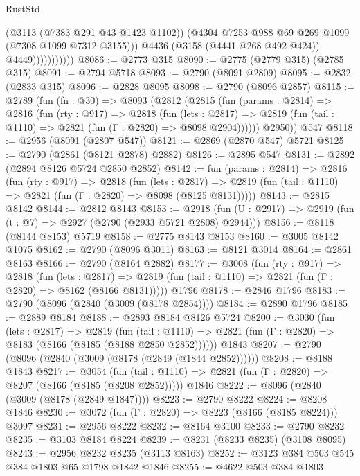 \begin{lexlean}{RustStd}
\begin{coremodule}
{\begin{coremodule}
{{{{{{{{{{{{{{{{{{{{{{{{{{                            (@3113 (@7383 @291 @43 @1423 @1102))
                            (@4304 @7253 @988 @69 @269 @1099 (@7308 @1099 @7312 @3155)))
                          @4436
                          (@3158 (@4441 @268 @492 @424))
                          @4449)))))))))))
@8086 := @2773 @315
@8090 := @2775 (@2779 @315) (@2785 @315)
@8091 := @2794 @5718
@8093 := @2790 (@8091 @2809)
@8095 := @2832 (@2833 @315)
@8096 := @2828 @8095
@8098 := @2790 (@8096 @2857)
@8115 := @2789
    (fun (fn : @30) =>
    @8093
      (@2812
        (@2815
          (fun (params : @2814) =>
          @2816
            (fun (rty : @917) =>
            @2818
              (fun (lets : @2817) =>
              @2819 (fun (tail : @1110) => @2821 (fun (Γ : @2820) => @8098 @2904))))))
        @2950))
    @547
@8118 := @2956 (@8091 (@2807 @547))
@8121 := @2869 (@2870 @547) @5721
@8125 := @2790 (@2861 (@8121 @2878) @2882)
@8126 := @2895 @547
@8131 := @2892 (@2894 @8126 @5724 @2850 @2852)
@8142 := fun (params : @2814) =>
  @2816
    (fun (rty : @917) =>
    @2818
      (fun (lets : @2817) =>
      @2819 (fun (tail : @1110) => @2821 (fun (Γ : @2820) => @8098 (@8125 @8131)))))
@8143 := @2815 @8142
@8144 := @2812 @8143
@8153 := @2918 (fun (U : @2917) => @2919 (fun (t : @7) => @2927 (@2790 (@2933 @5721 @2808) @2944)))
@8156 := @8118 (@8144 @8153) @5719
@8158 := @2775 @8143 @8153
@8160 := @3005 @8142 @1075
@8162 := @2790 (@8096 @3011)
@8163 := @8121 @3014
@8164 := @2861 @8163
@8166 := @2790 (@8164 @2882)
@8177 := @3008
    (fun (rty : @917) =>
    @2818
      (fun (lets : @2817) =>
      @2819 (fun (tail : @1110) => @2821 (fun (Γ : @2820) => @8162 (@8166 @8131)))))
    @1796
@8178 := @2846 @1796
@8183 := @2790 (@8096 (@2840 (@3009 (@8178 @2854))))
@8184 := @2890 @1796
@8185 := @2889 @8184
@8188 := @2893 @8184 @8126 @5724
@8200 := @3030
    (fun (lets : @2817) =>
    @2819
      (fun (tail : @1110) => @2821 (fun (Γ : @2820) => @8183 (@8166 (@8185 (@8188 @2850 @2852))))))
    @1843
@8207 := @2790 (@8096 (@2840 (@3009 (@8178 (@2849 (@1844 @2852))))))
@8208 := @8188 @1843
@8217 := @3054
    (fun (tail : @1110) => @2821 (fun (Γ : @2820) => @8207 (@8166 (@8185 (@8208 @2852)))))
    @1846
@8222 := @8096 (@2840 (@3009 (@8178 (@2849 @1847))))
@8223 := @2790 @8222
@8224 := @8208 @1846
@8230 := @3072 (fun (Γ : @2820) => @8223 (@8166 (@8185 @8224))) @3097
@8231 := @2956 @8222
@8232 := @8164 @3100
@8233 := @2790 @8232
@8235 := @3103 @8184 @8224
@8239 := @8231 (@8233 @8235) (@3108 @8095)
@8243 := @2956 @8232 @8235 (@3113 @8163)
@8252 := @3123 @384 @503 @545 @384 @1803 @65 @1798 @1842 @1846
@8255 := @4622 @503 @384 @1803
}}}}}}}}}}}}}}}}}}}}}}}}}}
\end{coremodule}}
\end{coremodule}
\end{lexlean}
